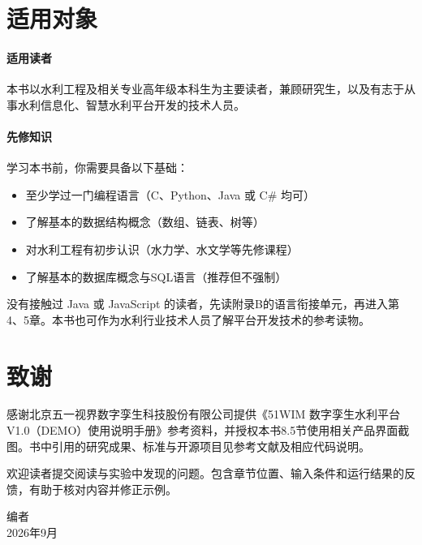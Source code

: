 \section*{适用对象}

\paragraph{适用读者}本书以水利工程及相关专业高年级本科生为主要读者，兼顾研究生，以及有志于从事水利信息化、智慧水利平台开发的技术人员。

\paragraph{先修知识}学习本书前，你需要具备以下基础：

\begin{itemize}
\item 至少学过一门编程语言（C、Python、Java 或 C\# 均可）
\item 了解基本的数据结构概念（数组、链表、树等）
\item 对水利工程有初步认识（水力学、水文学等先修课程）
\item 了解基本的数据库概念与SQL语言（推荐但不强制）
\end{itemize}

没有接触过 Java 或 JavaScript 的读者，先读附录B的语言衔接单元，再进入第4、5章。本书也可作为水利行业技术人员了解平台开发技术的参考读物。

\section*{致谢}

感谢北京五一视界数字孪生科技股份有限公司提供《51WIM 数字孪生水利平台 V1.0（DEMO）使用说明手册》参考资料，并授权本书8.5节使用相关产品界面截图。书中引用的研究成果、标准与开源项目见参考文献及相应代码说明。

欢迎读者提交阅读与实验中发现的问题。包含章节位置、输入条件和运行结果的反馈，有助于核对内容并修正示例。

\vspace{2em}
\begin{flushright}
编者\\
2026年9月
\end{flushright}
